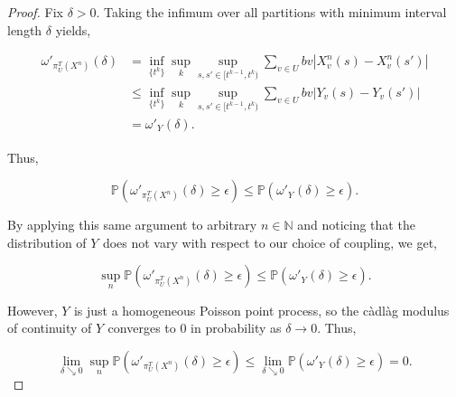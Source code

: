 \documentclass[12pt]{article}
\newcommand{\mb}{\mathbb}
\newcommand{\ra}{\rightarrow}
\newcommand{\ep}{\epsilon}
\newcommand{\pr}{\mb{P}}							%
\renewcommand{\v}{v}							%
\renewcommand{\U}{U}							%
\renewcommand{\b}{b}							%
\newcommand{\T}{T}								%
\renewcommand{\t}{t}							%
\newcommand{\pup}[1]{^{#1}}							%
\renewcommand{\tt}{s}								%
\newcommand{\ttt}{s'}								%
\renewcommand{\it}{k}								%
\newcommand{\numb}{n}								%
\newcommand{\piV}[2]{\pi_{#1}^{#2}}					%
\newcommand{\rxvtn}[3]{X_{#1}^{#3}(#2)}				%
\newcommand{\rxvtt}[2]{Y_{#1}{(#2)}}				%
\newcommand{\rxvtsn}[3]{X_{#1}^{#3}{#2}}			%
\newcommand{\rxvtts}[2]{Y_{#1}{#2}}					%
\begin{document}
\begin{proof}
Fix \(\delta > 0\). Taking the infimum over all partitions with minimum interval length \(\delta\) yields,

\begin{align*}
\omega'_{\piV{\U}{\T}\left(\rxvtsn{}{}{\numb}\right)}(\delta) &= \inf_{\{\t\pup{\it}\}}\sup_\it\sup_{\tt,\ttt \in [\t\pup{\it-1},\t\pup{\it})} \sum_{\v\in \U} \b{\v}|\rxvtn{\v}{\tt}{\numb} - \rxvtn{\v}{\ttt}{\numb}|\\
&\leq \inf_{\{\t\pup{\it}\}}\sup_\it\sup_{\tt,\ttt \in [\t\pup{\it-1},\t\pup{\it})} \sum_{\v\in \U} \b{\v}|\rxvtt{\v}{\tt} - \rxvtt{\v}{\ttt}|\\
&= \omega'_{\rxvtts{}{}}(\delta).
\end{align*}

Thus,

\[\pr\left(\omega'_{\piV{\U}{\T}\left(\rxvtsn{}{}{\numb}\right)}(\delta) \geq \ep\right) \leq \pr\left(\omega'_{\rxvtts{}{}}(\delta) \geq \ep\right).\]

By applying this same argument to arbitrary \(\numb\in \mb{N}\) and noticing that the distribution of \(\rxvtts{}{}\) does not vary with respect to our choice of coupling, we get,

\[\sup_{\numb}\pr\left(\omega'_{\piV{\U}{\T}\left(\rxvtsn{}{}{\numb}\right)}(\delta)\geq \ep\right) \leq \pr\left(\omega'_{\rxvtts{}{}}(\delta) \geq \ep\right).\]

However, \(\rxvtts{}{}\) is just a homogeneous Poisson point process, so the c\`adl\`ag modulus of continuity of \(\rxvtts{}{}\) converges to 0 in probability as \(\delta \ra 0\). Thus,

\[\lim_{\delta \searrow 0}\sup_{\numb}\pr\left(\omega'_{\piV{\U}{\T}\left(\rxvtsn{}{}{\numb}\right)}(\delta) \geq \ep\right) \leq \lim_{\delta\searrow 0}\pr\left(\omega'_{\rxvtts{}{}}(\delta)\geq \ep\right) = 0.\]


\end{proof}
\end{document}
